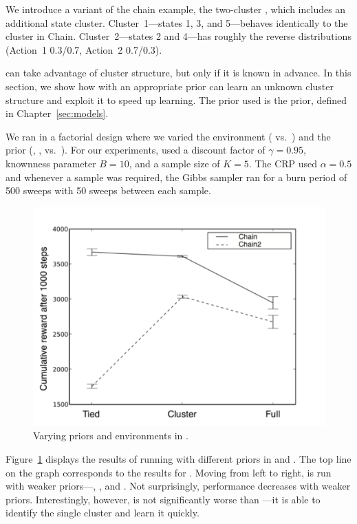 We introduce a variant of the chain example, the two-cluster ,
which includes an additional state cluster.  Cluster~1---states 1, 3,
and 5---behaves identically to the cluster in Chain.
Cluster~2---states 2 and 4---has roughly the reverse
distributions (Action~1 0.3/0.7, Action~2 0.7/0.3).

 can take advantage of
cluster structure, but only if it is known in advance.  In this
section, we show how  with an appropriate prior can learn an
unknown cluster structure and exploit it to speed up learning. The prior used is the  prior, defined in Chapter~\ref{sec:models}.


We ran  in a factorial design where we varied the environment
( vs.\ ) and the prior (, , vs.\ ).  For our
experiments,  used a discount factor of $\gamma = 0.95$,
knownness parameter $B=10$, and a sample size of $K=5$.  The
 CRP used $\alpha=0.5$ and whenever a
sample was required, the Gibbs sampler ran for a burn period of 500
sweeps with 50 sweeps between each sample.

\begin{figure}[t]
\begin{center}
\includegraphics[width=1.0\linewidth]{2x3}
\caption{Varying priors and environments in .}
\label{f:twobythree}
\end{center}
\end{figure}

Figure~\ref{f:twobythree} displays the results of running  with
different priors in  and .  The top line on the graph
corresponds to the results for .  Moving from left to right, 
is run with weaker priors---, , and .  Not
surprisingly, performance decreases with weaker priors.
Interestingly, however,  is not significantly worse than
---it is able to identify the single cluster and learn it quickly.

